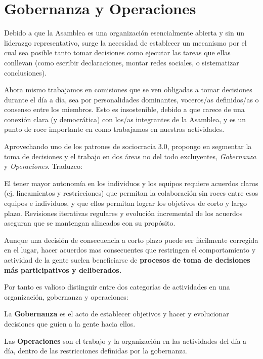 \documentclass[justified]{tufte-handout} %
\begin{document}
\section{Gobernanza y Operaciones}\label{sec:gobyop}
Debido a que la Asamblea es una organización esencialmente abierta y sin un liderazgo representativo, surge la necesidad de establecer un mecanismo por el cual sea posible tanto tomar decisiones como ejecutar las tareas que ellas conllevan (como escribir declaraciones, montar redes sociales, o sistematizar conclusiones).

Ahora mismo trabajamos en comisiones que se ven obligadas a tomar decisiones durante el día a día, sea por personalidades dominantes, voceros/as definidos/as o consenso entre los miembros. Esto es insostenible, debido a que carece de una conexión clara (y democrática) con los/as integrantes de la Asamblea, y es un punto de roce importante en como trabajamos en nuestras actividades.

Aprovechando uno de los patrones de sociocracia 3.0, propongo en segmentar la toma de decisiones y el trabajo en dos áreas no del todo excluyentes, \textit{Gobernanza} y \textit{Operaciones}. Traduzco\cite{gobernanzayoperaciones}:

\begin{displayquote}
	El tener mayor autonomía en los individuos y los equipos requiere acuerdos claros (ej. lineamientos y restricciones) que permitan la colaboración sin roces entre esos equipos e individuos, y que ellos permitan lograr los objetivos de corto y largo plazo. Revisiones iterativas regulares y evolución incremental de los acuerdos aseguran que se mantengan alineados con su propósito.

	Aunque una decisión de consecuencia a corto plazo puede ser fácilmente corregida en el lugar, hacer acuerdos mas consecuentes que restringen el comportamiento  y actividad de la gente suelen beneficiarse de \textbf{procesos de toma de decisiones más participativos y deliberados.}

	Por tanto es valioso distinguir entre dos categorías de actividades en una organización, gobernanza y operaciones:

	La \textbf{Gobernanza} es el acto de establecer objetivos y hacer y evolucionar decisiones que guíen a la gente hacia ellos.

	Las \textbf{Operaciones} son el trabajo y la organización en las actividades del día a día, dentro de las restricciones definidas por la gobernanza.
\end{displayquote}
\end{document}
